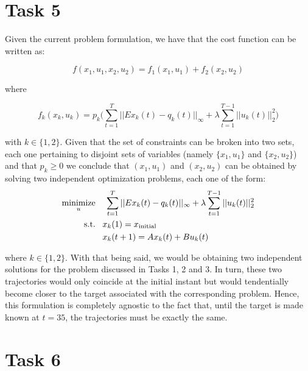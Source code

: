 \documentclass[12pt]{article}
\DeclareMathOperator*{\minimize}{minimize}
\begin{document}
\section{Task 5}

Given the current problem formulation, we have that the cost function can be written as:

\[
    f(x_1, u_1, x_2, u_2) = f_1(x_1, u_1) + f_2(x_2, u_2)
\]

where

\[
    f_k(x_k, u_k) = p_k \bigg( \sum_{t=1}^{T} ||Ex_k(t) - q_k(t)||_{\infty} +
    \lambda \sum_{t=1}^{T-1} ||u_k(t)||_{2}^2 \bigg)
\]

with $k \in \{1, 2\}$. Given that the set of constraints can be broken into two sets, each one pertaining to disjoint sets of variables (namely $\{x_1, u_1\}$ and $\{x_2, u_2\}$) and that $p_k \ge 0$ we conclude that $(x_1, u_1)$ and $(x_2, u_2)$ can be obtained by solving two independent optimization problems, each one of the form:
\vspace{-0.5em}
\begin{align*}
    \minimize_{u}& \hspace*{0.4cm} \sum_{t=1}^{T} ||Ex_k(t) - q_k(t)||_{\infty} +
    \lambda \sum_{t=1}^{T-1} ||u_k(t)||_{2}^2 \\
    \text{s.t.}& \;\;\; x_k(1) = x_{\text{initial}} \\ 
    & \;\;\; x_k(t + 1) = Ax_k(t) + Bu_k(t)
\end{align*}

where $k \in \{1, 2\}$. With that being said, we would be obtaining two independent solutions for the problem discussed in Tasks 1, 2 and 3. In turn, these two trajectories would only coincide at the initial instant but would tendentially become closer to the target associated with the corresponding problem. Hence, this formulation is completely agnostic to the fact that, until the target is made known at $t = 35$, the trajectories must be exactly the same.


\section{Task 6}
\end{document}
